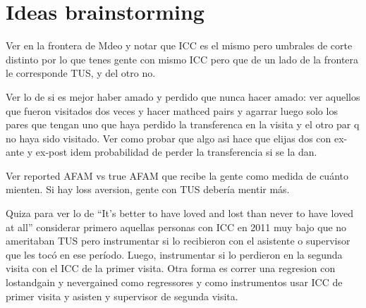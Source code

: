 \documentclass[12pt]{article}
\begin{document}
\section{Ideas brainstorming}
Ver en la frontera de Mdeo y notar que ICC es el mismo pero umbrales de corte distinto por lo que tenes gente con mismo ICC pero que de un lado de la frontera le corresponde TUS, y del otro no.

Ver lo de si es mejor haber amado y perdido que nunca hacer amado: ver aquellos que fueron visitados dos veces y hacer mathced pairs y agarrar luego solo los pares que tengan uno que haya perdido la transferenca en la visita y el otro par q no haya sido visitado. Ver como probar que algo asi hace que elijas dos con ex-ante y ex-post idem probabilidad de perder la transferencia si se la dan.

Ver reported AFAM vs true AFAM que recibe la gente como medida de cuánto mienten. Si hay loss aversion, gente con TUS debería mentir más.

Quiza para ver lo de ``It's better to have loved and lost than never to have loved at all'' considerar primero aquellas personas con ICC en 2011 muy bajo que no ameritaban TUS pero instrumentar si lo recibieron con el asistente o supervisor que les tocó en ese período. Luego, instrumentar si lo perdieron en la segunda visita con el ICC de la primer visita. Otra forma es correr una regresion con lostandgain y nevergained como regressores y como instrumentos usar ICC de primer visita y asisten y supervisor de segunda visita.



\end{document}
